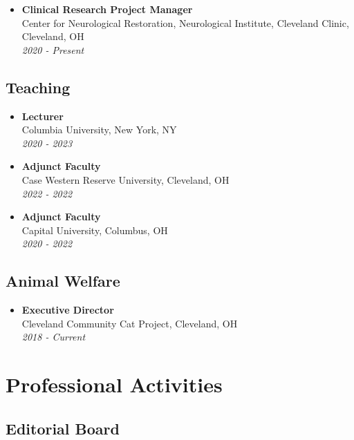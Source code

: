 \documentclass[
  letterpaper,
  DIV=11,
  numbers=noendperiod]{scrartcl}
\providecommand{\tightlist}{%
  \setlength{\itemsep}{0pt}\setlength{\parskip}{0pt}}\usepackage{longtable,booktabs,array}
\begin{document}
\begin{itemize}
\tightlist
\item
  \textbf{Clinical Research Project Manager}\\
  Center for Neurological Restoration, Neurological Institute, Cleveland
  Clinic, Cleveland, OH\\
  \emph{2020 - Present}
\end{itemize}

\subsection{Teaching}\label{teaching}

\begin{itemize}
\item
  \textbf{Lecturer}\\
  Columbia University, New York, NY\\
  \emph{2020 - 2023}
\item
  \textbf{Adjunct Faculty}\\
  Case Western Reserve University, Cleveland, OH\\
  \emph{2022 - 2022}
\item
  \textbf{Adjunct Faculty}\\
  Capital University, Columbus, OH\\
  \emph{2020 - 2022}
\end{itemize}

\subsection{Animal Welfare}\label{animal-welfare}

\begin{itemize}
\tightlist
\item
  \textbf{Executive Director}\\
  Cleveland Community Cat Project, Cleveland, OH\\
  \emph{2018 - Current}
\end{itemize}

\section{Professional Activities}\label{professional-activities}

\subsection{Editorial Board}\label{editorial-board}
\end{document}
